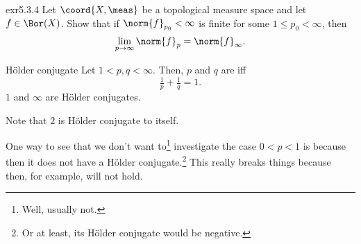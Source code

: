 \begin{exr}{}{exr5.3.4}
Let $\coord{X,\meas}$ be a topological measure space and let $f\in \Bor (X)$.  Show that if $\norm{f}_{p_0}<\infty$ is finite for some $1\leq p_0<\infty$, then
\begin{equation}
\lim _{p\to \infty}\norm{f}_p=\norm{f}_{\infty}.
\end{equation}
\end{exr}
\begin{dfn}{Hölder conjugate}{}
Let $1<p,q<\infty$.  Then, $p$ and $q$ are  iff
\begin{equation}
\tfrac{1}{p}+\tfrac{1}{q}=1.
\end{equation}
$1$ and $\infty$ are Hölder conjugates.
\begin{rmk}
Note that $2$ is Hölder conjugate to itself.
\end{rmk}
\begin{rmk}
One way to see that we don't want to\footnote{Well, usually not.} investigate the case $0<p<1$ is because then it does not have a Hölder conjugate.\footnote{Or at least, its Hölder conjugate would be negative.}  This really breaks things because then, for example,  will not hold.
\end{rmk}
\end{dfn}

